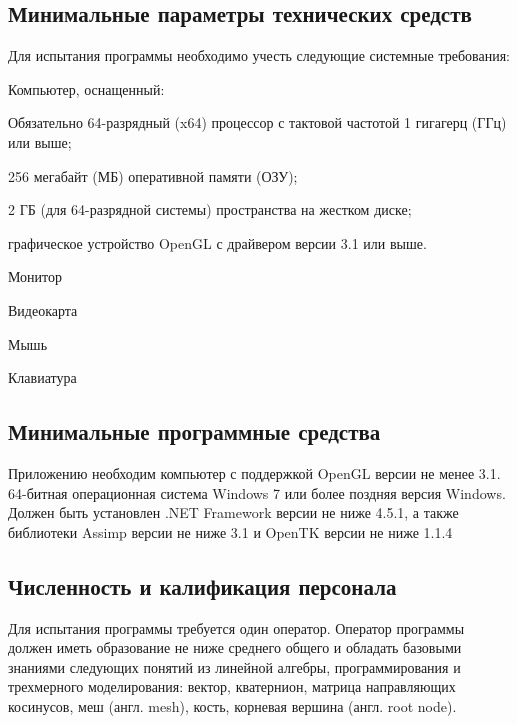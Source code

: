 \subsection{Минимальные параметры технических средств}
Для испытания программы необходимо учесть следующие системные требования:
\begin{my_enumerate}
\item Компьютер, оснащенный:
    \begin{my_enumerate}
    \item Обязательно 64-разрядный (x64) процессор с тактовой частотой 1 гигагерц (ГГц) или выше;
    \item 256 мегабайт (МБ) оперативной памяти (ОЗУ);
    \item 2 ГБ (для 64-разрядной системы) пространства на жестком диске;
    \item графическое устройство OpenGL с драйвером версии 3.1 или выше.
    \end{my_enumerate}
\item Монитор
\item Видеокарта
\item Мышь
\item Клавиатура
\end{my_enumerate}


\subsection{Минимальные программные средства}
Приложению необходим компьютер с поддержкой OpenGL версии не менее 3.1. 64-битная операционная система Windows 7 или более поздняя версия Windows. Должен быть установлен .NET Framework версии не ниже 4.5.1, а также библиотеки Assimp версии не ниже 3.1 и OpenTK версии не ниже 1.1.4

\subsection{Численность и калификация персонала}
Для испытания программы требуется один оператор. Оператор программы должен иметь образование не ниже среднего общего и обладать базовыми знаниями следующих понятий из линейной алгебры, программирования и трехмерного моделирования: вектор, кватернион, матрица направляющих косинусов, меш (англ. mesh), кость, корневая вершина (англ. root node).
